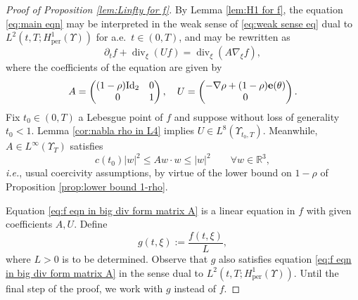 \documentclass[11pt,a4paper,reqno]{amsart}
\theoremstyle{remark}
\theoremstyle{definition}
\numberwithin{equation}{section}
\newcommand{\per}{\mathrm{per}}
\DeclareMathOperator{\dv}{div}
\newcommand{\e}{{\bf e}}
\newcommand{\bxi}{\xi}
\begin{document}
\begin{proof}[Proof of Proposition \ref{lem:Linfty for f}]
    By Lemma \ref{lem:H1 for f}, the equation \eqref{eq:main eqn} may be interpreted in the weak sense of \eqref{eq:weak sense eq} dual to $L^2(t,T;H^1_\per(\Upsilon))$ for a.e.~$t\in(0,T)$, and may be rewritten as 
    \begin{equation}\label{eq:f eqn in big div form matrix A}
        \partial_t f + \dv_{\bxi} (Uf) = \dv_{\bxi}(A\nabla_{\bxi}f), 
    \end{equation}
    where the coefficients of the equation are given by 
    \begin{equation}\label{eq:A def matrix}
        A = \left( \begin{matrix}
            (1-\rho)\mathrm{Id}_2 & 0 \\ 
            0 & 1 
        \end{matrix} \right), \quad U = \left( \begin{matrix}
        -\nabla \rho + (1-\rho) \e(\theta) \\ 0
        \end{matrix} \right). 
    \end{equation}
    Fix $t_0 \in (0,T)$ a Lebesgue point of $f$ and suppose without loss of generality $t_0 < 1$. Lemma \ref{cor:nabla rho in L4} implies $U \in L^8(\Upsilon_{t_0,T})$. Meanwhile, $A \in L^\infty(\Upsilon_T)$ satisfies 
    \begin{equation}\label{eq:coercivity for A}
       c(t_0)|w|^2 \leq A w \cdot w \leq |w|^2 \qquad \forall w \in \mathbb{R}^3, 
    \end{equation}
 \textit{i.e.}, usual coercivity assumptions, by virtue of the lower bound on $1-\rho$ of Proposition \ref{prop:lower bound 1-rho}. 
    


    Equation \eqref{eq:f eqn in big div form matrix A} is a linear equation in $f$ with given coefficients $A,U$. Define 
    \begin{equation}\label{eq:g def at start of moser proof}
        g(t,\bxi) := \frac{f(t,\bxi)}{L}, 
    \end{equation}
    where $L>0$ is to be determined. Observe that $g$ also satisfies equation \eqref{eq:f eqn in big div form matrix A} in the sense dual to $L^2(t,T;H^1_\per(\Upsilon))$. Until the final step of the proof, we work with $g$ instead of $f$. 

    \smallskip 


\end{proof}
\end{document}
